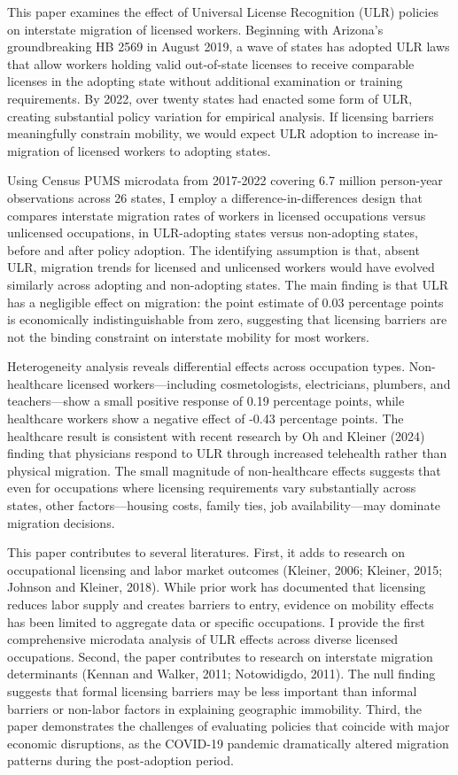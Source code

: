 \documentclass[12pt]{article}
\begin{document}
This paper examines the effect of Universal License Recognition (ULR) policies on interstate migration of licensed workers. Beginning with Arizona's groundbreaking HB 2569 in August 2019, a wave of states has adopted ULR laws that allow workers holding valid out-of-state licenses to receive comparable licenses in the adopting state without additional examination or training requirements. By 2022, over twenty states had enacted some form of ULR, creating substantial policy variation for empirical analysis. If licensing barriers meaningfully constrain mobility, we would expect ULR adoption to increase in-migration of licensed workers to adopting states.

Using Census PUMS microdata from 2017-2022 covering 6.7 million person-year observations across 26 states, I employ a difference-in-differences design that compares interstate migration rates of workers in licensed occupations versus unlicensed occupations, in ULR-adopting states versus non-adopting states, before and after policy adoption. The identifying assumption is that, absent ULR, migration trends for licensed and unlicensed workers would have evolved similarly across adopting and non-adopting states. The main finding is that ULR has a negligible effect on migration: the point estimate of 0.03 percentage points is economically indistinguishable from zero, suggesting that licensing barriers are not the binding constraint on interstate mobility for most workers.

Heterogeneity analysis reveals differential effects across occupation types. Non-healthcare licensed workers---including cosmetologists, electricians, plumbers, and teachers---show a small positive response of 0.19 percentage points, while healthcare workers show a negative effect of -0.43 percentage points. The healthcare result is consistent with recent research by Oh and Kleiner (2024) finding that physicians respond to ULR through increased telehealth rather than physical migration. The small magnitude of non-healthcare effects suggests that even for occupations where licensing requirements vary substantially across states, other factors---housing costs, family ties, job availability---may dominate migration decisions.

This paper contributes to several literatures. First, it adds to research on occupational licensing and labor market outcomes (Kleiner, 2006; Kleiner, 2015; Johnson and Kleiner, 2018). While prior work has documented that licensing reduces labor supply and creates barriers to entry, evidence on mobility effects has been limited to aggregate data or specific occupations. I provide the first comprehensive microdata analysis of ULR effects across diverse licensed occupations. Second, the paper contributes to research on interstate migration determinants (Kennan and Walker, 2011; Notowidigdo, 2011). The null finding suggests that formal licensing barriers may be less important than informal barriers or non-labor factors in explaining geographic immobility. Third, the paper demonstrates the challenges of evaluating policies that coincide with major economic disruptions, as the COVID-19 pandemic dramatically altered migration patterns during the post-adoption period.
\end{document}
